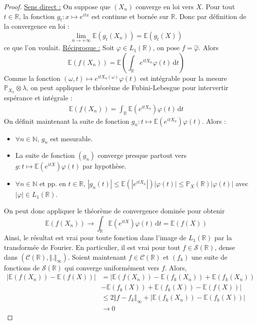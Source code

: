 	\begin{proof}
		\uline{Sens direct :} On suppose que $(X_n)$ converge en loi vers $X$. Pour tout $t \in \mathbb{R}$, la fonction $g_t : x \mapsto e^{itx}$ est continue et bornée sur $\mathbb{R}$. Donc par définition de la convergence en loi :
		\[ \lim_{n \rightarrow +\infty} \mathbb{E}(g_t(X_n)) = \mathbb{E}(g_t(X)) \]
		ce que l'on voulait.
		\newpar
		\uline{Réciproque :} Soit $\varphi \in L_1(\mathbb{R})$, on pose $f = \widehat{\varphi}$. Alors
		\[ \mathbb{E}(f(X_n)) = \mathbb{E} \left ( \int_{\mathbb{R}} e^{itX_n} \varphi(t) \, \mathrm{d}t \right ) \]
		Comme la fonction $(\omega, t) \mapsto e^{itX_n(\omega)} \varphi(t)$ est intégrable pour la mesure $\mathbb{P}_{X_n} \otimes \lambda$, on peut appliquer le théorème de Fubini-Lebesgue pour intervertir espérance et intégrale :
		\begin{align*}
			\mathbb{E}(f(X_n)) = \int_{\mathbb{R}} \mathbb{E} (e^{itX_n}) \varphi(t) \, \mathrm{d}t
		\end{align*}
		On définit maintenant la suite de fonction $g_n : t \mapsto \mathbb{E} (e^{itX_n}) \varphi(t)$. Alors :
		\begin{itemize}
			\item $\forall n \in \mathbb{N}$, $g_n$ est mesurable.
			\item La suite de fonction $(g_n)$ converge presque partout vers $g : t \mapsto \mathbb{E} (e^{itX}) \varphi(t)$ par hypothèse.
			\item $\forall n \in \mathbb{N}$ et pp. en $t \in \mathbb{R}$, $|g_n(t)| \leq \mathbb{E} (|e^{itX_n}|) |\varphi(t)| \leq \mathbb{P}_X(\mathbb{R}) |\varphi(t)|$ avec $|\varphi| \in L_1(\mathbb{R})$.
		\end{itemize}
		On peut donc appliquer le théorème de convergence dominée pour obtenir
		\[ \mathbb{E}(f(X_n)) \longrightarrow \int_{\mathbb{R}} \mathbb{E} (e^{itX}) \varphi(t) \, \mathrm{d}t = \mathbb{E}(f(X)) \]
		Ainsi, le résultat est vrai pour toute fonction dans l'image de $L_1(\mathbb{R})$ par la transformée de Fourier. En particulier, il est vrai pour tout $f \in \mathcal{S}(\mathbb{R})$, dense dans $(\mathcal{C}(\mathbb{R}), \Vert . \Vert_\infty)$. Soient maintenant $f \in \mathcal{C}(\mathbb{R})$ et $(f_k)$ une suite de fonctions de $\mathcal{S}(\mathbb{R})$ qui converge uniformément vers $f$. Alors,
		\begin{align*}
			|\mathbb{E}(f(X_n)) - \mathbb{E}(f(X))| &= |\mathbb{E}(f(X_n)) - \mathbb{E}(f_k(X_n)) + \mathbb{E}(f_k(X_n)) \\
			&- \mathbb{E}(f_k(X)) + \mathbb{E}(f_k(X)) - \mathbb{E}(f(X))| \\
			&\leq 2 \Vert f - f_k \Vert_\infty + |\mathbb{E}(f_k(X_n)) - \mathbb{E}(f_k(X))| \\
			&\longrightarrow 0
		\end{align*}
	\end{proof}

